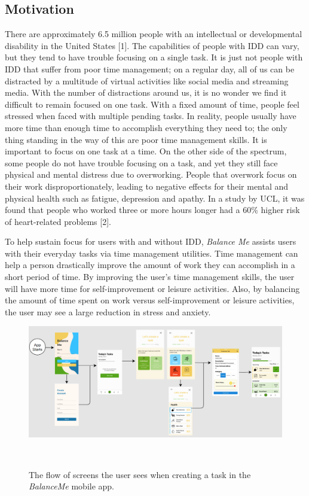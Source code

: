 \documentclass{sigchi}
\begin{document}
\subsection{Motivation}

There are approximately 6.5 million people with an intellectual or
developmental disability in the United States [1]. The capabilities of people
with IDD can vary, but they tend to have trouble focusing on a single task. It
is just not people with IDD that suffer from poor time management; on a regular
day, all of us can be distracted by a multitude of virtual activities like
social media and streaming media. With the number of distractions around us, it
is no wonder we find it difficult to remain focused on one task. With a fixed
amount of time, people feel stressed when faced with multiple pending tasks. In
reality, people usually have more time than enough time to accomplish
everything they need to; the only thing standing in the way of this are poor
time management skills. It is important to focus on one task at a time. On the
other side of the spectrum, some people do not have trouble focusing on a task,
and yet they still face physical and mental distress due to overworking. People
that overwork focus on their work disproportionately, leading to negative
effects for their mental and physical health such as fatigue, depression and
apathy. In a study by UCL, it was found that people who worked three or more
hours longer had a 60\% higher risk of heart-related problems [2].

To help sustain focus for users with and without IDD, \textit{Balance Me}
assists users with their everyday tasks via time management utilities. Time
management can help a person drastically improve the amount of work they can
accomplish in a short period of time. By improving the user’s time management
skills, the user will have more time for self-improvement or leisure
activities. Also, by balancing the amount of time spent on work versus
self-improvement or leisure activities, the user may see a large reduction in
stress and anxiety.

\begin{figure}
\centering
  \includegraphics[width=2\columnwidth]{figures/flow}
  \caption{The flow of screens the user sees when creating a task in the
	\textit{BalanceMe} mobile app. }~\label{fig:figure1}
\end{figure}
\end{document}
